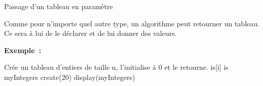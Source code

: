\begin{Fiche}{Passage d’un tableau en paramètre}
			
			Comme pour n’importe quel autre type, un algorithme peut retourner
			un tableau.  Ce sera à lui de le déclarer et de lui donner des
			valeurs.

			\textbf{Exemple~:}
			\begin{pseudocode}
				\LComment Crée un tableau d’entiers de taille n, 
					l’initialise à 0 et le retourne.
						\Let is[i] 
					\EndFor
					\Return is
				\EndAlgo
				\Empty
					\Let myIntegers \Gets create(20)
					\Stmt display(myIntegers)
				\EndAlgo
			\end{pseudocode}
	
\end{Fiche}
